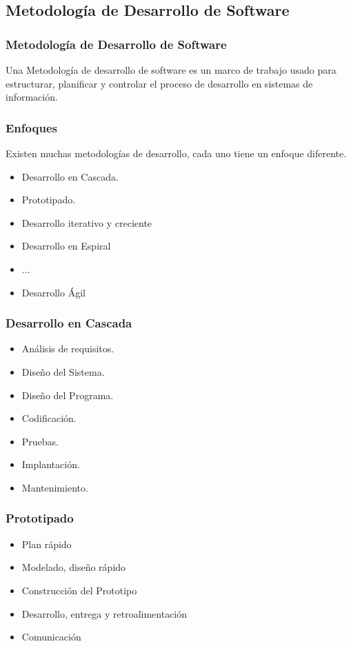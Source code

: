 \documentclass[12pt]{beamer}
\begin{document}
\subsection{Metodología de Desarrollo de Software}
\begin{frame}
 \frametitle{Metodología de Desarrollo de Software}
 Una Metodología de desarrollo de software es un marco de trabajo usado para estructurar, planificar y controlar el proceso de desarrollo en sistemas de información.
\end{frame}


\begin{frame}
 \frametitle{Enfoques}
 Existen muchas metodologías de desarrollo, cada uno tiene un enfoque diferente.
 \newline
 \begin{itemize}
  \item<2-> Desarrollo en Cascada.
  \item<3-> Prototipado.
  \item<4-> Desarrollo iterativo y creciente
  \item<5-> Desarrollo en Espiral
  \item<6-> ...
  \item<7-> Desarrollo Ágil
 \end{itemize}

\end{frame}


\begin{frame}
 \frametitle{Desarrollo en Cascada}
 \begin{itemize}
  \item Análisis de requisitos.
  \item Diseño del Sistema.
  \item Diseño del Programa.
  \item Codificación.
  \item Pruebas.
  \item Implantación.
  \item Mantenimiento.
 \end{itemize}
\end{frame}



\begin{frame}
 \frametitle{Prototipado}
 \begin{itemize}
  \item Plan rápido
  \item Modelado, diseño rápido
  \item Construcción del Prototipo
  \item Desarrollo, entrega y retroalimentación
  \item Comunicación 
 \end{itemize}
\end{frame}
\end{document}
